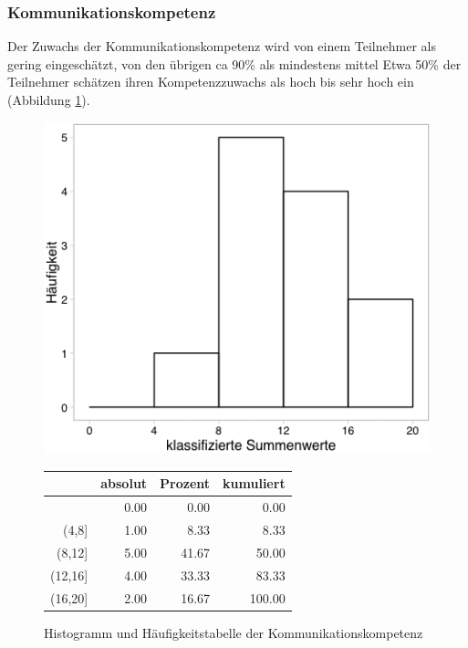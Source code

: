 \documentclass[12pt,smallheadings, bibliography=totoc]{scrartcl}
\begin{document}
\subsubsection{Kommunikationskompetenz}\label{kommunikationskompetenz}

Der Zuwachs der Kommunikationskompetenz wird von einem Teilnehmer als
gering eingeschätzt, von den übrigen ca 90\% als mindestens mittel Etwa
50\% der Teilnehmer schätzen ihren Kompetenzzuwachs als hoch bis sehr
hoch ein (Abbildung \ref{fig:KK}).

\begin{figure}[H]
\begin{minipage}{.4\linewidth}
\includegraphics[width=0.8\linewidth]{Anhang/KKHistnn.png}

\label{pic:aufbau}
\end{minipage}
\begin{minipage}{.4\linewidth}
\centering
\raisebox{\depth}
{\begin{tabular}{rrrr}
  \hline
 & absolut & Prozent & kumuliert \\
  \hline
[4] & 0.00 & 0.00 & 0.00 \\
  (4,8] & 1.00 & 8.33 & 8.33 \\
  (8,12] & 5.00 & 41.67 & 50.00 \\
  (12,16] & 4.00 & 33.33 & 83.33 \\
  (16,20] & 2.00 & 16.67 & 100.00 \\
   \hline
\end{tabular}

}
\label{tab:defis}
\end{minipage}
\caption{Histogramm und Häufigkeitstabelle der Kommunikationskompetenz}
\label{fig:KK}
\end{figure}
\end{document}
